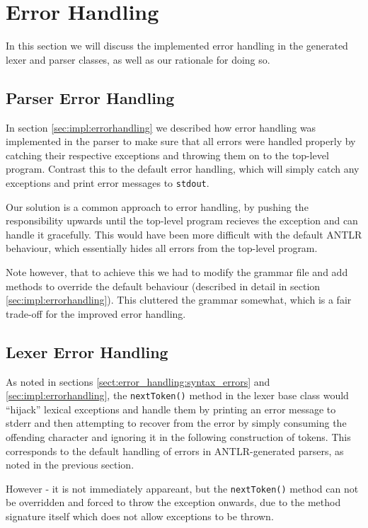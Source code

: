 \section{Error Handling}
\label{sect:discussion:error_handling}
In this section we will discuss the implemented error handling in the generated
lexer and parser classes, as well as our rationale for doing so. 

\subsection{Parser Error Handling}
In section \ref{sec:impl:errorhandling} we described how error handling was
implemented in the parser to make sure that all errors were handled properly by
catching their respective exceptions and throwing them on to the top-level
program. Contrast this to the default error handling, which will simply catch
any exceptions and print error messages to \verb!stdout!.

Our solution is a common approach to error handling, by pushing the
responsibility upwards until the top-level program recieves the exception and
can handle it gracefully. This would have been more difficult with the default
ANTLR behaviour, which essentially hides all errors from the top-level program.

Note however, that to achieve this we had to modify the grammar file and add
methods to override the default behaviour (described in detail in section
\ref{sec:impl:errorhandling}). This cluttered the grammar somewhat, which is a
fair trade-off for the improved error handling.

\subsection{Lexer Error Handling}
\label{sect:future_work:lexer_error_handling} %
As noted in sections \ref{sect:error_handling:syntax_errors} and
\ref{sec:impl:errorhandling}, the \verb!nextToken()! method in the lexer base class
would ``hijack'' lexical exceptions and handle them by printing an error message
to stderr and then attempting to recover from the error by simply consuming the
offending character and ignoring it in the following construction of tokens.
This corresponds to the default handling of errors in ANTLR-generated parsers,
as noted in the previous section.

However - it is not immediately appareant, but the \verb!nextToken()! method can
not be overridden and forced to throw the exception onwards, due to the method
signature itself which does not allow exceptions to be thrown. 


